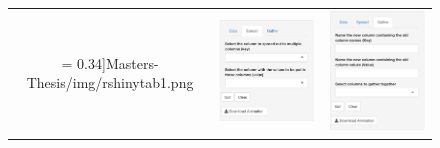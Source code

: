 \begin{figure}[H]
\begin{tabular}{ccc}
 = 0.34]{Masters-Thesis/img/rshinytab1.png} & \includegraphics[scale = 0.34]{Masters-Thesis/img/rshinytab2.png} & \includegraphics[scale = 0.34]{Masters-Thesis/img/rshinytab3.png} \\

\end{tabular}
\end{figure}
